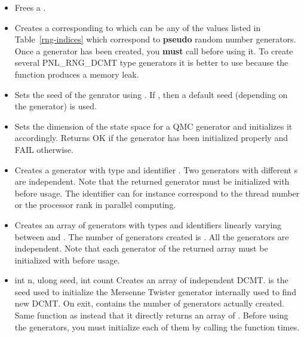\begin{itemize}
\item {}
  \sshortdescribe Frees a .
\item {}
  \sshortdescribe Creates a  corresponding to 
  which can be any of the values  listed in
  Table~\ref{rng-indices} which correspond to {\bf pseudo} random number generators.
  Once a generator has been created, you {\bf must} call
   before using it. To create several PNL_RNG_DCMT type
  generators it is better to use  because the
  function  produces a memory leak.
\item {}
  \sshortdescribe Sets the seed of the genrator  using . If
  , then a default seed (depending on the generator) is used.
\item {}
  \sshortdescribe Sets the dimension of the state space for a QMC generator and
  initializes it accordingly.  Returns OK if the generator has been initialized
  properly and FAIL otherwise.
\item {}
  \sshortdescribe Creates a generator with type  and identifier
  . Two generators with different s are independent. Note that
  the returned generator must be initialized with  before
  usage. The identifier  can for instance correspond to the thread
  number or the processor rank in parallel computing.
\item {}
  \sshortdescribe Creates an array of generators with types 
  and identifiers linearly varying between  and . The
  number of generators created is . All the
  generators are independent. Note that each generator of the returned array
  must be initialized with  before usage.
\item {}
  {int n, ulong seed, int \ptr count}
  \sshortdescribe Creates an array of  independent DCMT.  is
  the seed used to initialize the Mersenne Twister generator internally used to
  find new DCMT. On exit,  contains the number of generators actually
  created. Same function as  instead that it
  directly returns an array of . Before using the generators, you
  must initialize each of them by calling the function 
   times.
\end{itemize}

